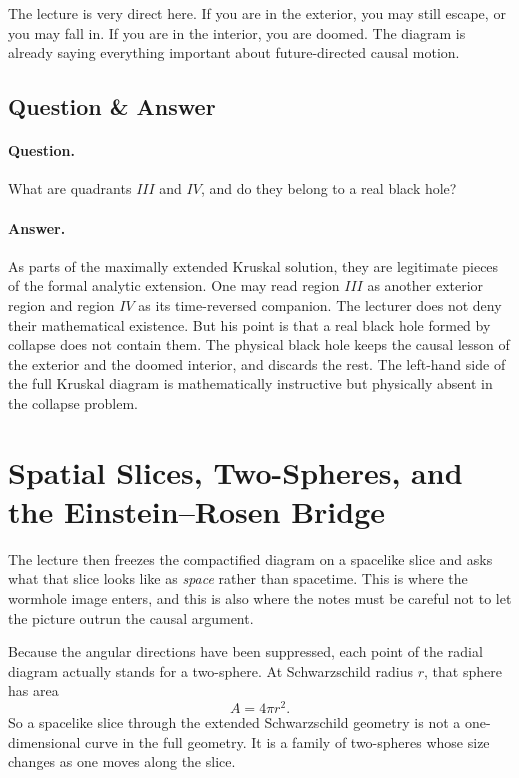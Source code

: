 The lecture is very direct here. If you are in the exterior, you may still escape, or you may fall in. If you are in the interior, you are doomed. The diagram is already saying everything important about future-directed causal motion.

\subsection{Question \& Answer}

\paragraph{Question.} What are quadrants \(III\) and \(IV\), and do they belong to a real black hole?

\paragraph{Answer.} As parts of the maximally extended Kruskal solution, they are legitimate pieces of the formal analytic extension. One may read region \(III\) as another exterior region and region \(IV\) as its time-reversed companion. The lecturer does not deny their mathematical existence. But his point is that a real black hole formed by collapse does not contain them. The physical black hole keeps the causal lesson of the exterior and the doomed interior, and discards the rest. The left-hand side of the full Kruskal diagram is mathematically instructive but physically absent in the collapse problem.

\section{Spatial Slices, Two-Spheres, and the Einstein--Rosen Bridge}

The lecture then freezes the compactified diagram on a spacelike slice and asks what that slice looks like as \emph{space} rather than spacetime. This is where the wormhole image enters, and this is also where the notes must be careful not to let the picture outrun the causal argument.

Because the angular directions have been suppressed, each point of the radial diagram actually stands for a two-sphere. At Schwarzschild radius \(r\), that sphere has area
\begin{equation}
A=4\pi r^2.
\end{equation}
So a spacelike slice through the extended Schwarzschild geometry is not a one-dimensional curve in the full geometry. It is a family of two-spheres whose size changes as one moves along the slice.

